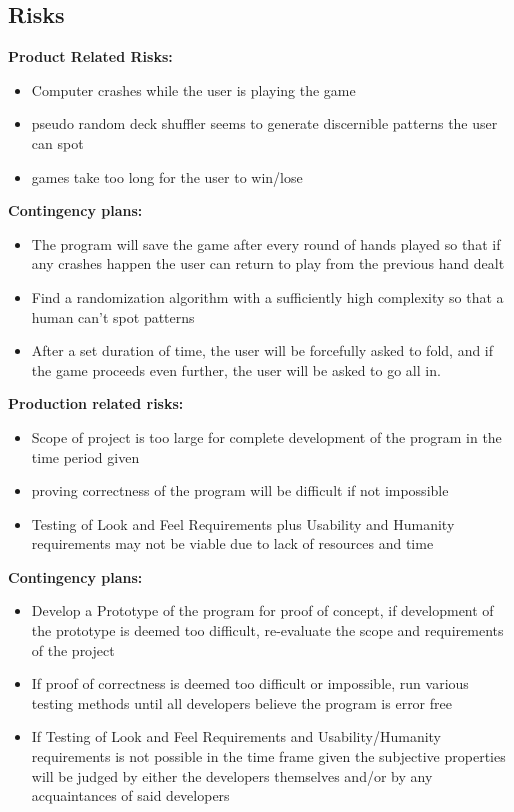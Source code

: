 \documentclass[12pt]{article}
\begin{document}
	\subsection{Risks}
	\textbf{Product Related Risks:}
	\begin{itemize}
	\item 	Computer crashes while the user is playing the game
	\item 	pseudo random deck shuffler seems to generate discernible patterns the user can 			spot
	\item 	games take too long for the user to win/lose 
	\end{itemize}
	\textbf{Contingency plans:}
	\begin{itemize}
	\item	The program will save the game after every round of hands played so that if any 			crashes happen the user can return to play from the previous hand dealt
	\item	Find a randomization algorithm with a sufficiently high complexity so that a 				human can't spot patterns
	\item	After a set duration of time, the user will be forcefully asked to fold, and if 			the game proceeds even further, the user will be asked to go all in.
	\end{itemize}
	\textbf{Production related risks:}
	\begin{itemize}
	\item	Scope of project is too large for complete development of the program in the 				time period given
	\item	proving correctness of the program will be difficult if not impossible
	\item 	Testing of Look and Feel Requirements plus Usability and Humanity requirements 				may not be viable due to lack of resources and time
	\end{itemize}
	\textbf{Contingency plans:}
	\begin{itemize}
	\item	Develop a Prototype of the program for proof of concept, if development of the 				prototype is deemed too difficult, re-evaluate the scope and requirements of 				the project 
	\item	If proof of correctness is deemed too difficult or impossible, run various 					testing methods until all developers believe the program is error free
	\item	If Testing of Look and Feel Requirements and Usability/Humanity requirements is 			not possible in the time frame given the subjective properties will be judged 				by either the developers themselves and/or by any acquaintances of said 					developers 
	\end{itemize}
\end{document}
